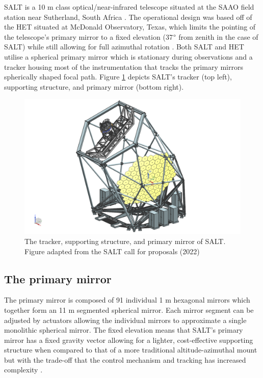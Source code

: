 \gls{SALT} is a 10 m class optical/near-infrared telescope situated at the \gls{SAAO} field station near Sutherland, South Africa \citep{SALT_optical_design}. The operational design was based off of the \gls{HET} situated at McDonald Observatory, Texas, which limits the pointing of the telescope's primary mirror to a fixed elevation (37$\degree$ from zenith in the case of SALT) while still allowing for full azimuthal rotation \citep{HET}. Both SALT and HET utilise a spherical primary mirror which is stationary during observations and a tracker housing most of the instrumentation that tracks the primary mirrors spherically shaped focal path. Figure \ref{fig:SALT_telescope} depicts \gls{SALT}'s tracker (top left), supporting structure, and primary mirror (bottom right).

\begin{figure}[t]
    \centering
    \includegraphics[width = 15cm]{figures/2_SALT_telescope.png}
    \caption{The tracker, supporting structure, and primary mirror of SALT. Figure adapted from the SALT call for proposals (2022)\protect\footnotemark}
    \label{fig:SALT_telescope}
\end{figure}

\subsection{The primary mirror}

The primary mirror is composed of 91 individual 1 m hexagonal mirrors which together form an 11 m segmented spherical mirror. Each mirror segment can be adjusted by actuators allowing the individual mirrors to approximate a single monolithic spherical mirror. The fixed elevation means that SALT's primary mirror has a fixed gravity vector allowing for a lighter, cost-effective supporting structure when compared to that of a more traditional altitude-azimuthal mount but with the trade-off that the control mechanism and tracking has increased complexity \citep{SALT_design}.

